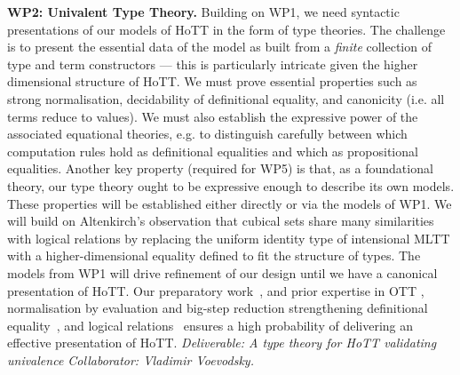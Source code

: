 \documentclass[a4paper,11pt]{article}
\begin{document}

{\bf WP2: Univalent Type Theory.} Building on WP1, we need syntactic
presentations of our models of HoTT in the form of type theories. The
challenge is to present the essential data of the model as built from
a {\em finite} collection of type and term constructors --- this is
particularly intricate given the  higher dimensional
structure of HoTT. We must prove essential properties such as strong normalisation, decidability of
definitional equality, and canonicity (i.e. all terms reduce to
values). We must also establish the expressive
power of the associated equational theories, e.g. to distinguish
carefully between which computation rules hold as definitional
equalities and which as propositional equalities. Another key property
(required for WP5) is that, as a foundational theory, our type theory
ought to be expressive enough to describe its own models. These
properties will be established either directly or via the models of
WP1.
We will build on Altenkirch's observation \cite{txa-ihp14} that cubical sets share
many similarities with logical relations by replacing the uniform
identity type of intensional MLTT with a higher-dimensional equality
defined to fit the structure of types. The models from WP1 will drive
refinement of our design until we have a canonical presentation of
HoTT. Our preparatory work~\cite{txa-ihp14}, and prior expertise in OTT
\cite{alti:ott-conf}, normalisation by evaluation and big-step
reduction \cite{alti:lics96} %
strengthening definitional
equality~\cite{Allais:2013:NEN:2502409.2502411}, and logical
relations~\cite{neil2014relParamDep} ensures a high probability of
delivering an effective presentation of HoTT.  {\em Deliverable: A
  type theory for HoTT validating univalence 
Collaborator: Vladimir Voevodsky.
}

\end{document}
